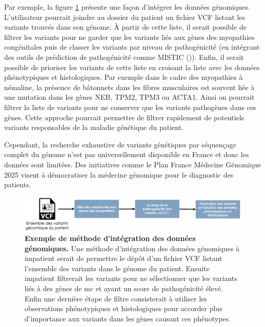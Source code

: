 Par exemple, la figure \ref{fig:variant_discuss} présente une façon d'intégrer les données génomiques. L'utilisateur pourrait joindre au dossier du patient un fichier VCF listant les variants trouvés dans son génome. À partir de cette liste, il serait possible de filtrer les variants pour ne garder que les variants liés aux gènes des myopathies congénitales puis de classer les variants par niveau de pathogénicité (en intégrant des outils de prédiction de pathogénicité comme MISTIC (\cite{chennen_mistic_2020})). Enfin, il serait possible de prioriser les variants de cette liste en croisant la liste avec les données phénotypiques et histologiques. Par exemple dans le cadre des myopathies à némaline, la présence de bâtonnets dans les fibres musculaires est souvent liée à une mutation dans les gènes NEB, TPM2, TPM3 ou ACTA1. Ainsi on pourrait filtrer la liste de variants pour ne conserver que les variants pathogènes dans ces gènes. Cette approche pourrait permettre de filtrer rapidement de potentiels variants responsables de la maladie génétique du patient.

Cependant, la recherche exhaustive de variants génétiques par séquençage complet du génome n'est pas universellement disponible en France et donc les données sont limitées. Des initiatives comme le Plan France Médecine Génomique 2025 visent à démocratiser la médecine génomique pour le diagnostic des patients.
 \begin{figure}[!ht]
 \centering
 \includegraphics[width=1\textwidth]{figures/variant_discuss.png}
 \caption[Exemple de méthode d'intégration des données génomiques]{\textbf{Exemple de méthode d'intégration des données génomiques.} Une méthode d'intégration des données génomiques à \gls{impatient} serait de permettre le dépôt d'un fichier VCF listant l'ensemble des variants dans le génome du patient. Ensuite \gls{impatient} filtrerait les variants pour ne sélectionner que les variants liés à des gènes de \gls{mc} et ayant un score de pathogénicité élevé. Enfin une dernière étape de filtre consisterait à utiliser les observations phénotypiques et histologiques pour accorder plus d'importance aux variants dans les gènes causant ces phénotypes.}
 \label{fig:variant_discuss}
\end{figure}

